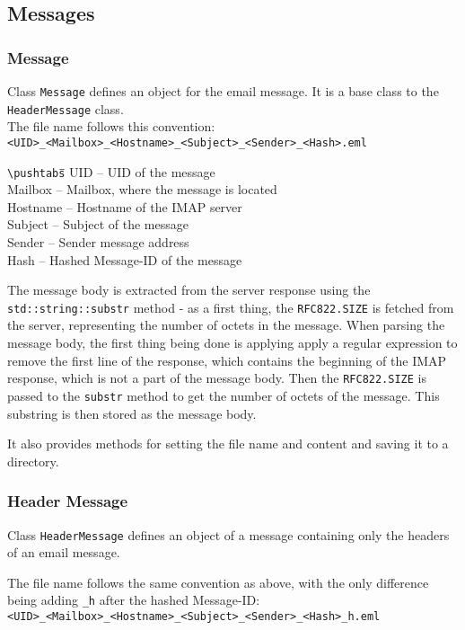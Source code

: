 \documentclass[11pt, a4paper]{article}
\begin{document}
\subsection{Messages}
\subsubsection{Message}
Class \verb|Message| defines an object for the email message. It is a base class to the \verb|HeaderMessage| class.\\
The file name follows this convention:\medskip\\\texttt{<UID>\_<Mailbox>\_<Hostname>\_<Subject>\_<Sender>\_<Hash>.eml}
\begin{tabbing}
  \verb|\pushtabs|\qquad \= \qquad \qquad\= \kill
  UID \>--\> UID of the message\\
  Mailbox \>--\> Mailbox, where the message is located\\
  Hostname \>--\> Hostname of the IMAP server\\
  Subject \>--\> Subject of the message\\
  Sender \>--\> Sender message address\\
  Hash \>--\> Hashed Message-ID of the message
\end{tabbing}

The message body is extracted from the server response using the \verb|std::string::substr| method - as a first thing, the \verb|RFC822.SIZE| is fetched from the server, representing the number of octets in the message. When parsing the message body, the first thing being done is applying apply a regular expression to remove the first line of the response, which contains the beginning of the IMAP response, which is not a part of the message body. Then the \verb|RFC822.SIZE| is passed to the \verb|substr| method to get the number of octets of the message. This substring is then stored as the message body.

It also provides methods for setting the file name and content and saving it to a directory.

\subsubsection{Header Message}
Class \verb|HeaderMessage| defines an object of a message containing only the headers of an email message.

The file name follows the same convention as above, with the only difference being adding \verb|_h| after the hashed Message-ID:\\\texttt{<UID>\_<Mailbox>\_<Hostname>\_<Subject>\_<Sender>\_<Hash>\_h.eml}
\end{document}

